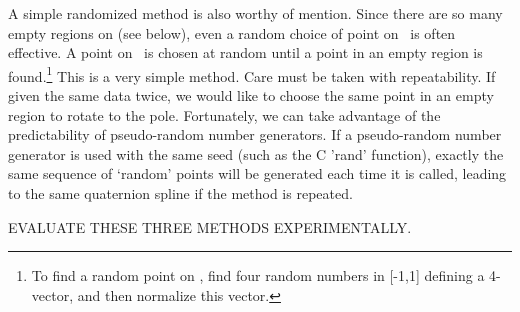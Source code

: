 \documentclass[11pt]{article}
\begin{document}
A simple randomized method is also worthy of mention.
Since there are so many empty regions on  (see below),
even a random choice of point on \ is often effective.
A point on \ is chosen at random until a point in an empty region 
is found.\footnote{To find a random point on , find four random numbers 
  in [-1,1] defining a 4-vector, and then normalize this vector.}
This is a very simple method.
Care must be taken with repeatability.
If given the same data twice, we would like to choose the same point in an empty region
to rotate to the pole.
Fortunately, we can take advantage of the predictability 
of pseudo-random number generators.
If a pseudo-random number generator is used with the same seed
(such as the C 'rand' function), exactly the same sequence of `random' points will be 
generated each time it is called,
leading to the same quaternion spline if the method is repeated.

EVALUATE THESE THREE METHODS EXPERIMENTALLY.

\end{document}
